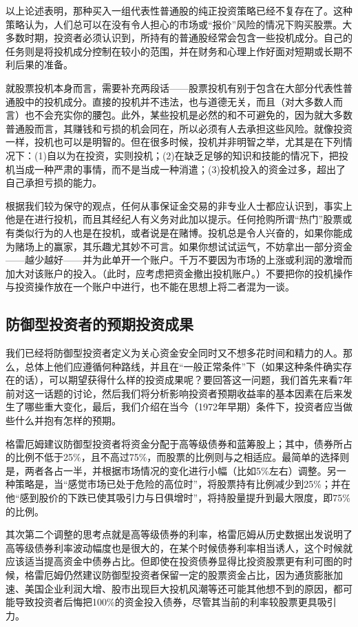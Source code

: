 \documentclass[12pt,oneside]{book}
\begin{document}
以上论述表明，那种买入一组代表性普通股的纯正投资策略已经不复存在了。这种策略认为，人们总可以在没有令人担心的市场或“报价”风险的情况下购买股票。大多数时期，投资者必须认识到，所持有的普通股经常会包含一些投机成分。自己的任务则是将投机成分控制在较小的范围，并在财务和心理上作好面对短期或长期不利后果的准备。

就股票投机本身而言，需要补充两段话——股票投机有别于包含在大部分代表性普通股中的投机成分。直接的投机并不违法，也与道德无关，而且（对大多数人而言）也不会充实你的腰包。此外，某些投机是必然的和不可避免的，因为就大多数普通股而言，其赚钱和亏损的机会同在，所以必须有人去承担这些风险。就像投资一样，投机也可以是明智的。但在很多时候，投机并非明智之举，尤其是在下列情况下：(1)自以为在投资，实则投机；(2)在缺乏足够的知识和技能的情况下，把投机当成一种严肃的事情，而不是当成一种消遣；(3)投机投入的资金过多，超出了自己承担亏损的能力。

根据我们较为保守的观点，任何从事保证金交易的非专业人士都应认识到，事实上他是在进行投机，而且其经纪人有义务对此加以提示。任何抢购所谓“热门”股票或有类似行为的人也是在投机，或者说是在赌博。投机总是令人兴奋的，如果你能成为赌场上的赢家，其乐趣尤其妙不可言。如果你想试试运气，不妨拿出一部分资金——越少越好——并为此单开一个账户。千万不要因为市场的上涨或利润的激增而加大对该账户的投入。（此时，应考虑把资金撤出投机账户。）不要把你的投机操作与投资操作放在一个账户中进行，也不能在思想上将二者混为一谈。

\subsection{防御型投资者的预期投资成果}
我们已经将防御型投资者定义为关心资金安全同时又不想多花时间和精力的人。那么，总体上他们应遵循何种路线，并且在“一般正常条件”下（如果这种条件确实存在的话），可以期望获得什么样的投资成果呢？要回答这一问题，我们首先来看7年前对这一话题的讨论，然后我们将分析影响投资者预期收益率的基本因素在后来发生了哪些重大变化，最后，我们介绍在当今（1972年早期）条件下，投资者应当做些什么并抱有怎样的预期。

格雷厄姆建议防御型投资者将资金分配于高等级债券和蓝筹股上；其中，债券所占的比例不低于25\%，且不高过75\%，而股票的比例则与之相适应。最简单的选择则是，两者各占一半，并根据市场情况的变化进行小幅（比如5\%左右）调整。另一种策略是，当“感觉市场已处于危险的高位时”，将股票持有比例减少到25\%；并在他“感到股价的下跌已使其吸引力与日俱增时”，将持股量提升到最大限度，即75\%的比例。

其次第二个调整的思考点就是高等级债券的利率，格雷厄姆从历史数据出发说明了高等级债券利率波动幅度也是很大的，在某个时候债券利率相当诱人，这个时候就应该适当提高资金中债券占比。但即使在投资债券显得比投资股票更有利可图的时候，格雷厄姆仍然建议防御型投资者保留一定的股票资金占比，因为通货膨胀加速、美国企业利润大增、股市出现巨大投机风潮等还可能其他想不到的原因，都可能导致投资者后悔把100\%的资金投入债券，尽管其当前的利率较股票更具吸引力。
\end{document}
